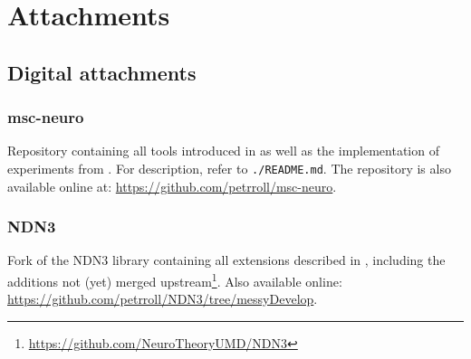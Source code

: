 \appendix
\chapter{Attachments}

\section{Digital attachments}

\subsection{msc-neuro}\label{at:msc-neuro}
Repository containing all tools introduced in  as well as the implementation of experiments from . For description, refer to \texttt{./README.md}. The repository is also available online at: \href{https://github.com/petrroll/msc-neuro}{https://github.com/petrroll/msc-neuro}.

\subsection{NDN3}\label{at:ndn3}
Fork of the NDN3 library containing all extensions described in , including the additions not (yet) merged upstream\footnote{\href{https://github.com/NeuroTheoryUMD/NDN3}{https://github.com/NeuroTheoryUMD/NDN3}}. Also available online: \href{https://github.com/petrroll/NDN3/tree/messyDevelop}{https://github.com/petrroll/NDN3/tree/messy\-Develop}.